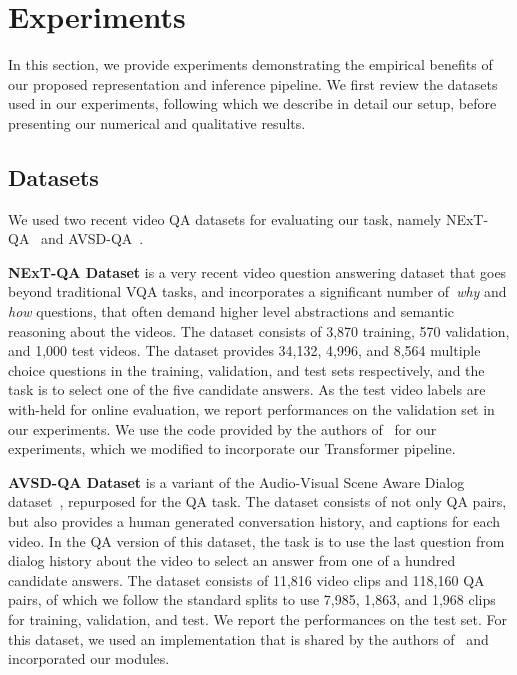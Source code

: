\documentclass[letterpaper]{article} \usepackage{aaai22}  \usepackage{times}  \usepackage{helvet}  \usepackage{courier}  \usepackage[hyphens]{url}  \usepackage{graphicx} \urlstyle{rm} \def\UrlFont{\rm}  \usepackage{natbib}  \usepackage{caption} \DeclareCaptionStyle{ruled}{labelfont=normalfont,labelsep=colon,strut=off} \frenchspacing  \setlength{\pdfpagewidth}{8.5in}  \setlength{\pdfpageheight}{11in}  \usepackage{algorithm}
\begin{document}
\section{Experiments}
In this section, we provide experiments demonstrating the empirical benefits of our proposed representation and inference pipeline. We first review the datasets used in our experiments, following which we describe in detail our setup, before presenting our numerical and qualitative results.

\subsection{Datasets}
We used two recent video QA datasets for evaluating our task, namely NExT-QA~\cite{xiao2021next} and AVSD-QA~\cite{alamri2019audio}. 

\noindent\textbf{NExT-QA Dataset} is a very recent video question answering dataset that goes beyond traditional VQA tasks, and incorporates a significant number of~\emph{why} and \emph{how} questions, that often demand higher level abstractions and semantic reasoning about the videos. The dataset consists of 3,870 training, 570 validation, and 1,000 test videos. The dataset provides 34,132, 4,996, and 8,564 multiple choice questions in the training, validation, and test sets respectively, and the task is to select one of the five candidate answers.  As the test video labels are with-held for online evaluation, we report performances on the validation set in our experiments. We use the code provided by the authors of~\cite{xiao2021next} for our experiments, which we modified to incorporate our Transformer pipeline.

\noindent\textbf{AVSD-QA Dataset} is a variant of the Audio-Visual Scene Aware Dialog dataset~\cite{AVSD@DSTC7}, repurposed for the QA task. The dataset consists of not only QA pairs, but also provides a human generated conversation history, and  captions for each video. In the QA version of this dataset, the task is to use the last question from dialog history about the video to select an answer from one of a hundred candidate answers. The dataset consists of 11,816 video clips and 118,160 QA pairs, of which we follow the standard splits to use 7,985, 1,863, and 1,968 clips for training, validation, and test. We report the performances on the test set. For this dataset, we used an implementation that is shared by the authors of~\cite{geng2021dynamic} and incorporated our modules.
\end{document}
